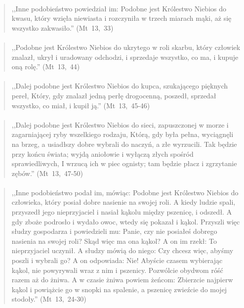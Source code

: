 \documentclass[10pt,a4paper,oneside]{article}
\begin{document}
\paragraph{}
\begin{quote}
,,Inne podobieństwo powiedział im: Podobne jest Królestwo Niebios do kwasu, który wzięła niewiasta i rozczyniła w trzech miarach mąki, aż się wszystko zakwasiło.'' \mbox{(Mt 13, 33)}
\end{quote}
\paragraph{}
\begin{quote}
,,Podobne jest Królestwo Niebios do ukrytego w roli skarbu, który człowiek znalazł, ukrył i uradowany odchodzi, i sprzedaje wszystko, co ma, i kupuje oną rolę.'' \mbox{(Mt 13, 44)}
\end{quote}
\paragraph{}
\begin{quote}
,,Dalej podobne jest Królestwo Niebios do kupca, szukającego pięknych pereł, Który, gdy znalazł jedną perłę drogocenną, poszedł, sprzedał wszystko, co miał, i kupił ją.'' \mbox{(Mt 13, 45-46)}
\end{quote}
\paragraph{}
\begin{quote}
,,Dalej podobne jest Królestwo Niebios do sieci, zapuszczonej w morze i zagarniającej ryby wszelkiego rodzaju, Którą, gdy była pełna, wyciągnęli na brzeg, a usiadłszy dobre wybrali do naczyń, a złe wyrzucili. Tak będzie przy końcu świata; wyjdą aniołowie i wyłączą złych spośród sprawiedliwych, I wrzucą ich w piec ognisty; tam będzie płacz i zgrzytanie zębów.'' \mbox{(Mt 13, 47-50)}
\end{quote}
\paragraph{}
\begin{quote}
,,Inne podobieństwo podał im, mówiąc: Podobne jest Królestwo Niebios do człowieka, który posiał dobre nasienie na swojej roli. A kiedy ludzie spali, przyszedł jego nieprzyjaciel i nasiał kąkolu między pszenicę, i odszedł. A gdy zboże podrosło i wydało owoc, wtedy się pokazał i kąkol. Przyszli więc słudzy gospodarza i powiedzieli mu: Panie, czy nie posiałeś dobrego nasienia na swojej roli? Skąd więc ma ona kąkol? A on im rzekł: To nieprzyjaciel uczynił. A słudzy mówią do niego: Czy chcesz więc, abyśmy poszli i wybrali go? A on odpowiada: Nie! Abyście czasem wybierając kąkol, nie powyrywali wraz z nim i pszenicy. Pozwólcie obydwom róść razem aż do żniwa. A w czasie żniwa powiem żeńcom: Zbierzcie najpierw kąkol i powiążcie go w snopki na spalenie, a pszenicę zwieźcie do mojej stodoły.'' \mbox{(Mt 13, 24-30)}
\end{quote}
\end{document}
